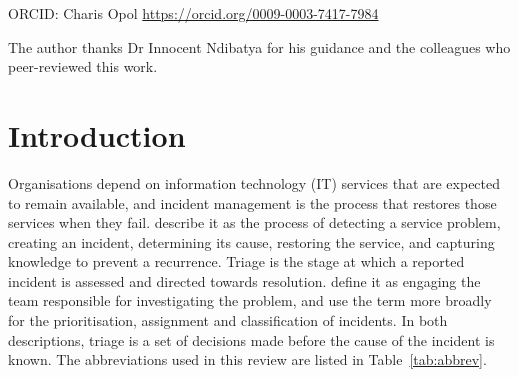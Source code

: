 \documentclass[pdflatex,sn-basic]{sn-jnl}
\begin{document}
\noindent ORCID: Charis Opol \url{https://orcid.org/0009-0003-7417-7984}

\begin{samepage}
The author thanks Dr Innocent Ndibatya for his guidance and the colleagues who peer-reviewed this work.
\end{samepage}

\section{Introduction}\label{sec:intro}

Organisations depend on information technology (IT) services that are expected to remain available, and incident management is the process that restores those services when they fail. \citet{chen2020} describe it as the process of detecting a service problem, creating an incident, determining its cause, restoring the service, and capturing knowledge to prevent a recurrence. Triage is the stage at which a reported incident is assessed and directed towards resolution. \citet{chen2020} define it as engaging the team responsible for investigating the problem, and \citet{remil2024} use the term more broadly for the prioritisation, assignment and classification of incidents. In both descriptions, triage is a set of decisions made before the cause of the incident is known. The abbreviations used in this review are listed in Table~\ref{tab:abbrev}.
\end{document}
